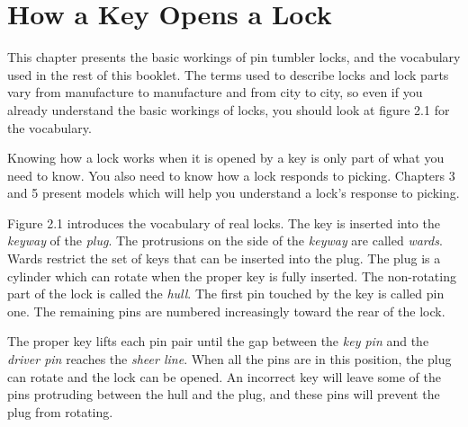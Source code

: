\chapter{How a Key Opens a Lock}
This chapter presents the basic workings of pin tumbler locks, and the vocabulary used in the
rest of this booklet. The terms used to describe locks and lock parts vary from manufacture
to manufacture and from city to city, so even if you already understand the basic workings
of locks, you should look at figure 2.1 for the vocabulary.

Knowing how a lock works when it is opened by a key is only part of what you need to
know. You also need to know how a lock responds to picking. Chapters 3 and 5 present
models which will help you understand a lock's response to picking.

Figure 2.1 introduces the vocabulary of real locks. The key is inserted into the \textit{keyway}
of the \textit{plug}. The protrusions on the side of the \textit{keyway} are called \textit{wards}.
Wards restrict the set of keys that can be inserted into the plug. The plug is a cylinder which can rotate when the proper key is fully inserted. The non-rotating part of the lock is called the \textit{hull}.
The first pin touched by the key is called pin one. The remaining pins are numbered increasingly toward the rear of the lock.

The proper key lifts each pin pair until the gap between the \textit{key pin} and the \textit{driver pin}
reaches the \textit{sheer line}. When all the pins are in this position, the plug can rotate and the
lock can be opened. An incorrect key will leave some of the pins protruding between the
hull and the plug, and these pins will prevent the plug from rotating.
